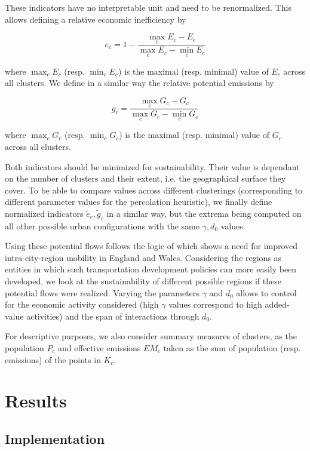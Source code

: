 \documentclass{jimis-en}
\begin{document}
These indicators have no interpretable unit and need to be renormalized. This allows defining a relative economic inefficiency by 

\begin{equation}
e_c = 1 - \frac{\max_c E_c - E_c}{\max_c E_c - \min_c E_c}
\end{equation}

where $\max_c E_c$ (resp. $\min_c E_c$) is the maximal (resp. minimal) value of $E_c$ across all clusters. We define in a similar way the relative potential emissions by

\begin{equation}
g_c = \frac{\max_c G_c - G_c}{\max_c G_c - \min_c G_c}
\end{equation}

where $\max_c G_c$ (resp. $\min_c G_c$) is the maximal (resp. minimal) value of $G_c$ across all clusters.

Both indicators should be minimized for sustainability. Their value is dependant on the number of clusters and their extent, i.e. the geographical surface they cover. To be able to compare values across different clusterings (corresponding to different parameter values for the percolation heuristic), we finally define normalized indicators $\tilde{e}_c,\tilde{g}_c$ in a similar way, but the extrema being computed on all other possible urban configurations with the same $\gamma,d_0$ values.

Using these potential flows follows the logic of \cite{arbabi2019development} which shows a need for improved intra-city-region mobility in England and Wales. Considering the regions as entities in which such transportation development policies can more easily been developed, we look at the sustainability of different possible regions if these potential flows were realized. Varying the parameters $\gamma$ and $d_0$ allows to control for the economic activity considered (high $\gamma$ values correspond to high added-value activities) and the span of interactions through $d_0$.

For descriptive purposes, we also consider summary measures of clusters, as the population $P_c$ and effective emissions $EM_c$ taken as the sum of population (resp. emissions) of the points in $K_c$.


\section{Results}

\subsection{Implementation}
\end{document}

